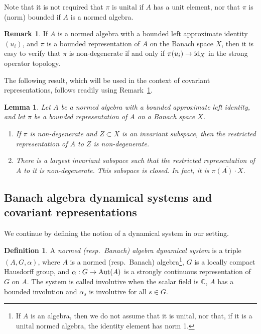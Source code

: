 \documentclass{amsart}
\theoremstyle{plain}
\newtheorem{lemma}[theorem]{Lemma}
\theoremstyle{definition}
\newtheorem{defn}[theorem]{Definition}
\newtheorem{remark}[theorem]{Remark}
\numberwithin{equation}{section}
\begin{document}
Note that it is not required that $\pi$ is unital if $A$ has a unit element, nor that $\pi$ is (norm) bounded if $A$ is a normed algebra.

\begin{remark}\label{r:strong_continuity_approx_identity}
 If $A$ is a normed algebra with a bounded left approximate identity $(u_i)$, and $\pi$ is a bounded representation of $A$ on the Banach space $X$, then it is easy to verify that $\pi$ is non-degenerate if and only if $\pi(u_i) \to {\textup{id}}_X$ in the strong operator topology.
\end{remark}

The following result, which will be used in the context of covariant representations, follows readily using Remark~\ref{r:strong_continuity_approx_identity}.

\begin{lemma}\label{l:alg_restriction_also_non_degenerate}
Let $A$ be a normed algebra with a bounded approximate left identity, and let $\pi$ be a bounded representation of $A$ on a Banach space $X$.
\begin{enumerate}
\item If $\pi$ is non-degenerate and $Z\subset X$ is an invariant subspace, then the restricted representation of $A$ to $Z$ is non-degenerate.
\item There is a largest invariant subspace such that the restricted representation of $A$ to it is non-degenerate. This subspace is closed. In fact, it is $\overline{\pi(A)\cdot X}$.
\end{enumerate}
\end{lemma}

\subsection{Banach algebra dynamical systems and covariant representations}\label{subsec:banach_algebra_dynamical_systems}

We continue by defining the notion of a dynamical system in our setting.

\begin{defn}\label{d:banach_algebra_dynamical_system}
A \emph{normed (resp.\ Banach) algebra dynamical system} is a triple ${(A,G,\alpha)}$, where $A$ is a normed (resp.\ Banach) algebra\footnote{If $A$ is an algebra, then we do not assume that it is unital, nor that, if it is a unital normed algebra, the identity element has norm 1.}, $G$ is a locally compact Hausdorff group, and $\alpha: G \to {\textup{Aut}}(A)$ is a strongly continuous representation of $G$ on $A$. The system is called involutive when the scalar field is ${\mathbb{C}}$, $A$ has a bounded involution and $\alpha_s$ is involutive for all $s\in G$.
\end{defn}
\end{document}
